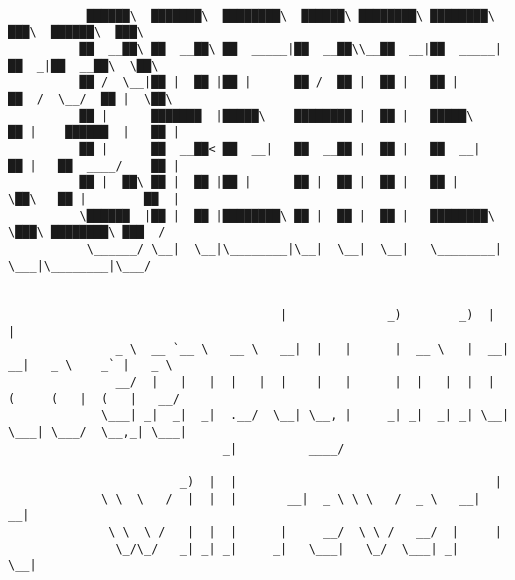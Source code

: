 \documentclass[varwidth=\maxdimen,margin=0.5cm,multi={verbatim}]{standalone}
\begin{document}
\begin{verbatim}

           ██████\  ███████\  ████████\  ██████\ ████████\ ████████\      ███\  ██████\  ███\
          ██  __██\ ██  __██\ ██  _____|██  __██\\__██  __|██  _____|    ██  _|██  __██\  \██\
          ██ /  \__|██ |  ██ |██ |      ██ /  ██ |  ██ |   ██ |         ██  /  \__/  ██ |  \██\
          ██ |      ███████  |█████\    ████████ |  ██ |   █████\       ██ |    ██████  |   ██ |
          ██ |      ██  __██< ██  __|   ██  __██ |  ██ |   ██  __|      ██ |   ██  ____/    ██ |
          ██ |  ██\ ██ |  ██ |██ |      ██ |  ██ |  ██ |   ██ |         \██\   ██ |        ██  |
          \██████  |██ |  ██ |████████\ ██ |  ██ |  ██ |   ████████\     \███\ ████████\ ███  /
           \______/ \__|  \__|\________|\__|  \__|  \__|   \________|      \___|\________|\___/


                                      |              _)        _)  |                         |
               _ \  __ `__ \   __ \   __|  |   |      |  __ \   |  __|       __|   _ \    _` |   _ \
               __/  |   |   |  |   |  |    |   |      |  |   |  |  |        (     (   |  (   |   __/
             \___| _|  _|  _|  .__/  \__| \__, |     _| _|  _| _| \__|     \___| \___/  \__,_| \___|
                              _|          ____/

                        _)  |  |                                    |
             \ \  \   /  |  |  |       __|  _ \ \ \   /  _ \   __|  __|
              \ \  \ /   |  |  |      |     __/  \ \ /   __/  |     |
               \_/\_/   _| _| _|     _|   \___|   \_/  \___| _|    \__|



\end{verbatim}
\end{document}
